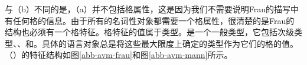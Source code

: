 \zl
与（b）不同的是，（a）并不包括格属性，这是因为我们不需要说明Frau的描写中有任何格的信息。由于所有的名词性对象都需要一个格属性，很清楚的是Frau的结构也必须有一个格特征。格特征的值属于类型。是一个一般类型，它包括次级类型、、和。具体的语言对象总是将这些最大限度上确定的类型作为它们的格的值。（）的特征结构如图\ref{abb-avm-frau}和图\ref{abb-avm-mann}所示。

